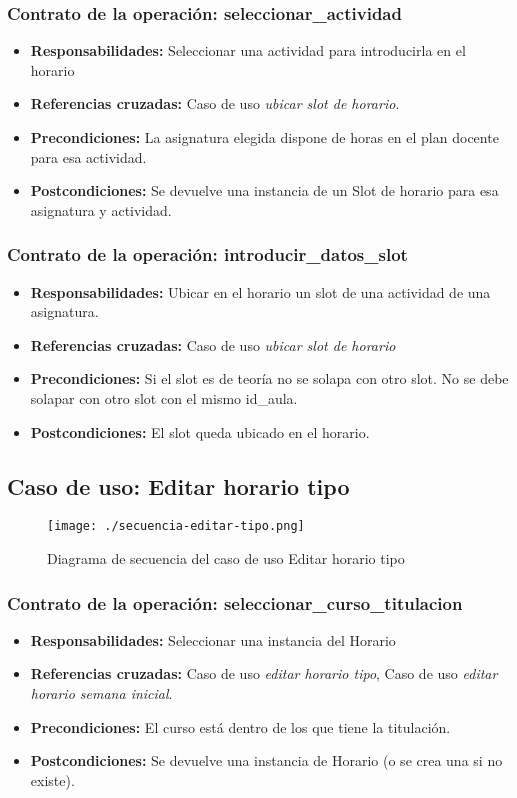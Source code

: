 \subsubsection{Contrato de la operación: seleccionar\_actividad}
\begin{itemize}
\item {\bf Responsabilidades:} Seleccionar una actividad para introducirla en el horario
\item {\bf Referencias cruzadas:} Caso de uso {\em ubicar slot de horario}.
\item {\bf Precondiciones:} La asignatura elegida dispone de horas en el plan docente para esa actividad.
\item {\bf Postcondiciones:} Se devuelve una instancia de un Slot de horario para esa asignatura y actividad.
\end{itemize}

\subsubsection{Contrato de la operación: introducir\_datos\_slot}
\begin{itemize}
\item {\bf Responsabilidades:} Ubicar en el horario un slot de una actividad de una asignatura.
\item {\bf Referencias cruzadas:} Caso de uso {\em ubicar slot de horario}
\item {\bf Precondiciones:} Si el slot es de teoría no se solapa con otro slot. No se debe solapar con otro slot con el mismo id\_aula.
\item {\bf Postcondiciones:} El slot queda ubicado en el horario.
\end{itemize}

\subsection{Caso de uso: Editar horario tipo}
\begin{figure}[H] 
  \label{comportamiento-editar-tipo} 
	\begin{center}
    \texttt{[image: ./secuencia-editar-tipo.png]}
  \end{center}
\caption{Diagrama de secuencia del caso de uso Editar horario tipo}
\end{figure}

\subsubsection{Contrato de la operación: seleccionar\_curso\_titulacion}
\begin{itemize}
\item {\bf Responsabilidades:} Seleccionar una instancia del Horario
\item {\bf Referencias cruzadas:} Caso de uso {\em editar horario tipo}, Caso de uso {\em editar horario semana inicial}.
\item {\bf Precondiciones:} El curso está dentro de los que tiene la titulación.
\item {\bf Postcondiciones:} Se devuelve una instancia de Horario (o se crea una si no existe).
\end{itemize}

